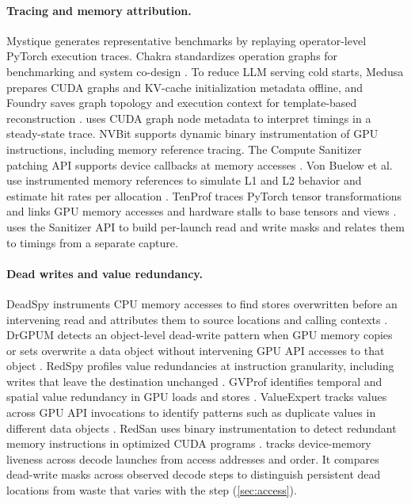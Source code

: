 \paragraph{Tracing and memory attribution.}
Mystique generates representative benchmarks by replaying operator-level
PyTorch execution traces. Chakra standardizes operation graphs for
benchmarking and system co-design
\cite{liang2023mystique,sridharan2023chakra}. To reduce LLM serving
cold starts, Medusa prepares CUDA graphs and KV-cache initialization
metadata offline, and Foundry saves graph topology and execution
context for template-based reconstruction
\cite{zeng2025medusa,liu2026foundry}. \sys{} uses CUDA graph node
metadata to interpret timings in a steady-state trace.
NVBit supports dynamic binary instrumentation of GPU instructions,
including memory reference tracing. The Compute Sanitizer patching API
supports device callbacks at memory accesses
\cite{villa2019nvbit,nvidiaSanitizerApi}. Von Buelow et al. use
instrumented memory references to simulate L1 and L2 behavior and
estimate hit rates per allocation \cite{buelow2022finegrained}.
TenProf traces PyTorch tensor transformations and links GPU memory
accesses and hardware stalls to base tensors and views
\cite{ding2026tenprof}.
\sys{} uses the Sanitizer API to build per-launch read and write masks
and relates them to timings from a separate capture.

\paragraph{Dead writes and value redundancy.}
DeadSpy instruments CPU memory accesses to find stores overwritten
before an intervening read and attributes them to source locations and
calling contexts \cite{chabbi2012deadspy}. DrGPUM detects an
object-level dead-write pattern when GPU memory copies or sets overwrite
a data object without intervening GPU API accesses to that object
\cite{lin2023drgpum}. RedSpy profiles value redundancies at instruction
granularity, including writes that leave the destination unchanged
\cite{wen2017redspy}. GVProf identifies temporal and spatial value
redundancy in GPU loads and stores \cite{zhou2020gvprof}. ValueExpert
tracks values across GPU API invocations to identify patterns such as
duplicate values in different data objects \cite{zhou2022valueexpert}.
RedSan uses binary instrumentation to detect redundant memory
instructions in optimized CUDA programs \cite{zhao2025redsan}.
\sys{} tracks device-memory liveness across decode launches from
access addresses and order. It compares dead-write masks across
observed decode steps to distinguish persistent dead locations from
waste that varies with the step (\cref{sec:access}).

